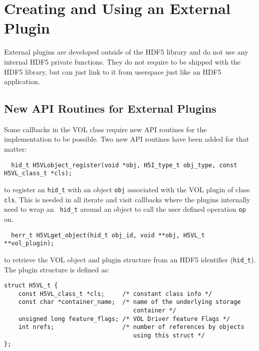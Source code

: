 \section{Creating and Using an External Plugin}
External plugins are developed outside of the HDF5 library and do not
use any internal HDF5 private functions. They do not require to be
shipped with the HDF5 library, but can just link to it from userspace
just like an HDF5 application.

\subsection{New API Routines for External Plugins}
Some callbacks in the VOL class require new API routines for the
implementation to be possible. Two new API routines have been added for
that matter:
\begin{lstlisting}
  hid_t H5VLobject_register(void *obj, H5I_type_t obj_type, const H5VL_class_t *cls);
\end{lstlisting}
to register an {\tt hid\_t} with an object {\tt obj} associated with
the VOL plugin of class {\tt cls}. This is needed in all iterate and
visit callbacks where the plugins internally need to wrap an {\tt
  hid\_t} around an object to call the user defined operation {\tt op}
on.

\begin{lstlisting}
  herr_t H5VLget_object(hid_t obj_id, void **obj, H5VL_t **vol_plugin);
\end{lstlisting}
to retrieve the VOL object and plugin structure from an HDF5
identifier ({\tt hid\_t}). The plugin structure is defined as:
\begin{lstlisting}
struct H5VL_t {
    const H5VL_class_t *cls;     /* constant class info */
    const char *container_name;  /* name of the underlying storage 
                                    container */
    unsigned long feature_flags; /* VOL Driver feature Flags */
    int nrefs;                   /* number of references by objects
                                    using this struct */
};
\end{lstlisting}

